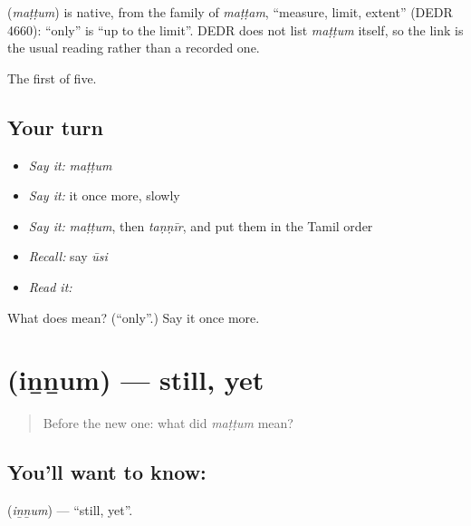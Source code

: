 \begin{cousinweb}
\textbf{} (\emph{maṭṭum}) is native, from the family of \emph{maṭṭam}, \textquotedblleft{}measure, limit, extent\textquotedblright{} (DEDR 4660): \textquotedblleft{}only\textquotedblright{} is \textquotedblleft{}up to the limit\textquotedblright{}. DEDR does not list \emph{maṭṭum} itself, so the link is the usual reading rather than a recorded one.
\end{cousinweb}

\begin{grammarlens}[title={What you've built}]
The first of five.
\end{grammarlens}

\subsection*{Your turn}
\begin{itemize}
\raggedright
  \item \emph{Say it:} \emph{maṭṭum}
  \item \emph{Say it:} it once more, slowly
  \item \emph{Say it:} \emph{maṭṭum}, then \emph{taṇṇīr}, and put them in the Tamil order
  \item \emph{Recall:} say \emph{ūsi}
  \item \emph{Read it:} \textbf{}
\end{itemize}

\begin{tcolorbox}[breakable,colback=teal!4,colframe=teal!35!black,title={Before you move on}]
What does  mean? (\textquotedblleft{}only\textquotedblright{}.) Say it once more.
\end{tcolorbox}
\section[\texorpdfstring{\ta{இன்னும்} (iṉṉum)}{இன்னும் (iṉṉum)}]{ (iṉṉum) — still, yet}

\label{lesson:TA-C62-still}



\begin{quote}
Before the new one: what did \emph{maṭṭum} mean?
\end{quote}

\subsection*{You'll want to know: }
\textbf{} (\emph{iṉṉum}) — \textquotedblleft{}still, yet\textquotedblright{}.

